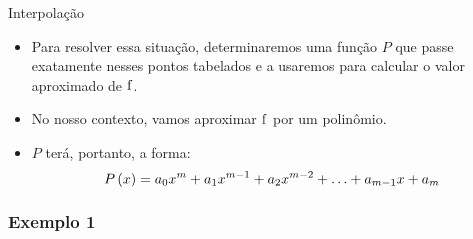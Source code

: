 \begin{frame}{Interpolação}

\begin{itemize}[<+->]
  \item Para resolver essa situação, determinaremos uma função $P$ que passe exatamente nesses pontos tabelados e a usaremos para calcular o valor aproximado de $\mathrm{f}$.
  \item No nosso contexto, vamos aproximar $\mathrm{f}$ por um polinômio.
  \item $P$ terá, portanto, a forma:
\[
P\left(x\right) = a_0 x^m + a_1 x^{m-1} + a_2 x^{m-2} + \ldots + a_{m-1} x + a_m
\]
\end{itemize}

\end{frame}

\subsubsection{Exemplo 1}

